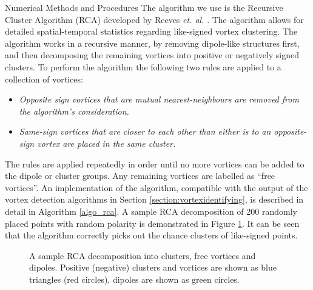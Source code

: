 \begin{chapter}{\label{cha:numerics}Numerical Methods and Procedures}
The algorithm we use is the Recursive Cluster Algorithm (RCA) developed by Reeves {\it et. al.} \cite{reeves_billam_13, reeves}. The algorithm allows for detailed spatial-temporal statistics regarding like-signed vortex clustering. The algorithm works in a recursive manner, by removing dipole-like structures first, and then decomposing the remaining vortices into positive or negatively signed clusters. To perform the algorithm the following two rules are applied to a collection of vortices:
\begin{itemize}
\item {\it Opposite sign vortices that are mutual nearest-neighbours are removed from the algorithm's consideration.}
\item {\it Same-sign vortices that are closer to each other than either is to an opposite-sign vortex are placed in the same cluster.}
\end{itemize}
The rules are applied repeatedly in order until no more vortices can be added to the dipole or cluster groups. Any remaining vortices are labelled as ``free vortices''. An implementation of the algorithm, compatible with the output of the vortex detection algorithms in Section \ref{section:vortexidentifying}, is described in detail in Algorithm \ref{algo_rca}. A sample RCA decomposition of 200 randomly placed points with random polarity is demonstrated in Figure \ref{fig:rca}. It can be seen that the algorithm correctly picks out the chance clusters of like-signed points. 

\begin{figure}[!ht]
\centering
\caption{A sample RCA decomposition into clusters, free vortices and dipoles. Positive (negative) clusters and vortices are shown as blue triangles (red circles), dipoles are shown as green circles.}\label{fig:rca}
\end{figure}


\end{chapter}
